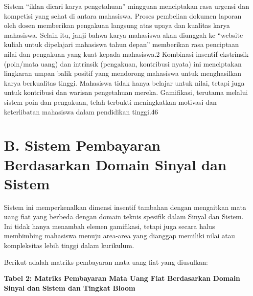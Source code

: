 \documentclass[
  letterpaper,
  DIV=11,
  numbers=noendperiod]{scrreprt}
\begin{document}
Sistem ``iklan dicari karya pengetahuan'' mingguan menciptakan rasa
urgensi dan kompetisi yang sehat di antara mahasiswa. Proses pembelian
dokumen laporan oleh dosen memberikan pengakuan langsung atas upaya dan
kualitas karya mahasiswa. Selain itu, janji bahwa karya mahasiswa akan
diunggah ke ``website kuliah untuk dipelajari mahasiswa tahun depan''
memberikan rasa penciptaan nilai dan pengakuan yang kuat kepada
mahasiswa.2 Kombinasi insentif ekstrinsik (poin/mata uang) dan intrinsik
(pengakuan, kontribusi nyata) ini menciptakan lingkaran umpan balik
positif yang mendorong mahasiswa untuk menghasilkan karya berkualitas
tinggi. Mahasiswa tidak hanya belajar untuk nilai, tetapi juga untuk
kontribusi dan warisan pengetahuan mereka. Gamifikasi, terutama melalui
sistem poin dan pengakuan, telah terbukti meningkatkan motivasi dan
keterlibatan mahasiswa dalam pendidikan tinggi.46

\section{B. Sistem Pembayaran Berdasarkan Domain Sinyal dan
Sistem}\label{b.-sistem-pembayaran-berdasarkan-domain-sinyal-dan-sistem}

Sistem ini memperkenalkan dimensi insentif tambahan dengan mengaitkan
mata uang fiat yang berbeda dengan domain teknis spesifik dalam Sinyal
dan Sistem. Ini tidak hanya menambah elemen gamifikasi, tetapi juga
secara halus membimbing mahasiswa menuju area-area yang dianggap
memiliki nilai atau kompleksitas lebih tinggi dalam kurikulum.

Berikut adalah matriks pembayaran mata uang fiat yang diusulkan:

\textbf{Tabel 2: Matriks Pembayaran Mata Uang Fiat Berdasarkan Domain
Sinyal dan Sistem dan Tingkat Bloom}
\end{document}
